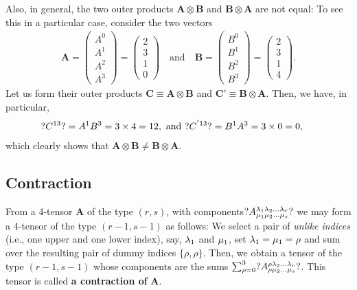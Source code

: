 Also, in general, the two outer products 
$\mathbf{A}\otimes \mathbf{B}$ and  $\mathbf{B} \otimes 
\mathbf{A}$ are not equal:  To see this in 
a particular case, consider the two vectors 
\begin{align*}
\mathbf{A} 
=\begin{pmatrix}A^0\\A^1\\A^2\\A^3\end{pmatrix} 
=\begin{pmatrix}2\\3\\1\\0\end{pmatrix} \quad 
\text{and} 
\quad \mathbf{B}=
\begin{pmatrix}B^0\\B^1\\B^2\\B^3\end{pmatrix} 
=\begin{pmatrix}2\\3\\1\\4\end{pmatrix}.
\end{align*}
Let us  form their outer products  
$\mathbf{C}\equiv \mathbf{A} \otimes 
\mathbf{B}$ and $\mathbf{C'}\equiv \mathbf{B} 
\otimes \mathbf{A}$. Then, we have, in particular, 
\begin{align*}
\hspace*{-5mm}?C^{13}?=A^1 B^3=3\times4=12,      
\text{ and }  
?{C}^{'13}?=B^1 A^3=3\times0=0,  
\end{align*}
which clearly shows that $\mathbf{A} 
\otimes \mathbf{B}\neq\mathbf{B} 
\otimes \mathbf{A}$.

\subsection{Contraction}
From a 4-tensor $\mathbf{A}$ of the type $ (r,s)$, with 
components\break $?A^{{\lambda}_1 {\lambda}_2 
\dots {\lambda}_r}_{{\mu}_1 {\mu}_2 \dots   {\mu}_s}?$
we may form a 4-tensor of the type $(r-1,s-1)$ as 
follows: We select a pair of \textit{unlike indices} 
(i.e., one upper and one lower 
index), say,  ${\lambda}_1$ and ${\mu}_1$, set  ${\lambda}_1 
={\mu}_1=\rho$ and sum over the resulting pair of dummy 
indices $\{\rho,\rho\}$. Then, we obtain a tensor of 
the type $(r-1,s-1)$
whose components are the sums 
$\sum_{{\rho}=0}^{3}?A^{{\rho} {\lambda}_2 \dots {\lambda}_r}_{{\rho} 
{\mu}_2 \dots {\mu}_s}?$. This tensor  is    called 
\textbf{a contraction of} $\mathbf{A}$.

